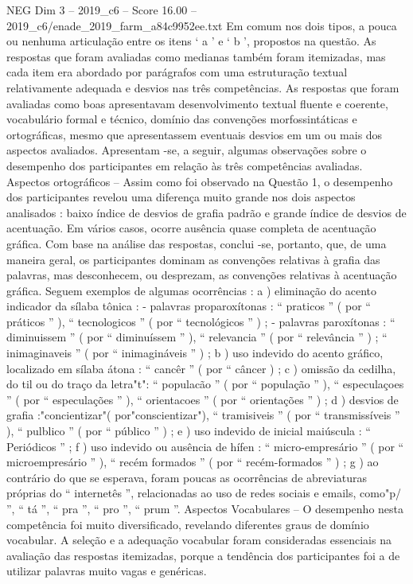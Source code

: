 \begin{textsample}{NEG Dim 3 – 2019\_c6 – Score 16.00 – 2019\_c6/enade\_2019\_farm\_a84c9952ee.txt}
Em comum nos dois tipos, a pouca ou nenhuma articulação entre os itens ‘ a ’ e ‘ b ’, propostos na questão.
As respostas que foram avaliadas como medianas também foram itemizadas, mas cada item era abordado por parágrafos com uma estruturação textual relativamente adequada e desvios nas três competências.
As respostas que foram avaliadas como boas apresentavam desenvolvimento textual fluente e coerente, vocabulário formal e técnico, domínio das convenções morfossintáticas e ortográficas, mesmo que apresentassem eventuais desvios em um ou mais dos aspectos avaliados.
Apresentam -se, a seguir, algumas observações sobre o desempenho dos participantes em relação às três competências avaliadas.
Aspectos ortográficos – Assim como foi observado na Questão 1, o desempenho dos participantes revelou uma diferença muito grande nos dois aspectos analisados : baixo índice de desvios de grafia padrão e grande índice de desvios de acentuação.
Em vários casos, ocorre ausência quase completa de acentuação gráfica.
Com base na análise das respostas, conclui -se, portanto, que, de uma maneira geral, os participantes dominam as convenções relativas à grafia das palavras, mas desconhecem, ou desprezam, as convenções relativas à acentuação gráfica.
Seguem exemplos de algumas ocorrências : a ) eliminação do acento indicador da sílaba tônica : - palavras proparoxítonas : “ praticos ” ( por “ práticos ” ), “ tecnologicos ” ( por “ tecnológicos ” ) ; - palavras paroxítonas : “ diminuissem ” ( por “ diminuíssem ” ), “ relevancia ” ( por “ relevância ” ) ; “ inimaginaveis ” ( por “ inimagináveis ” ) ; b ) uso indevido do acento gráfico, localizado em sílaba átona : “ cancêr ” ( por “ câncer ) ; c ) omissão da cedilha, do til ou do traço da letra"t": “ populacão ” ( por “ população ” ), “ especulaçoes ” ( por “ especulações ” ), “ orientacoes ” ( por “ orientações ” ) ; d ) desvios de grafia :"concientizar"( por"conscientizar"), “ tramisiveis ” ( por “ transmissíveis ” ), “ pulblico ” ( por “ público ” ) ; e ) uso indevido de inicial maiúscula : “ Periódicos ” ; f ) uso indevido ou ausência de hífen : “ micro-empresário ” ( por “ microempresário ” ), “ recém formados ” ( por “ recém-formados ” ) ; g ) ao contrário do que se esperava, foram poucas as ocorrências de abreviaturas próprias do “ internetês ”, relacionadas ao uso de redes sociais e emails, como"p/ ”, “ tá ”, “ pra ”, “ pro ”, “ prum ”.
Aspectos Vocabulares – O desempenho nesta competência foi muito diversificado, revelando diferentes graus de domínio vocabular.
A seleção e a adequação vocabular foram consideradas essenciais na avaliação das respostas itemizadas, porque a tendência dos participantes foi a de utilizar palavras muito vagas e genéricas.

\end{textsample}
